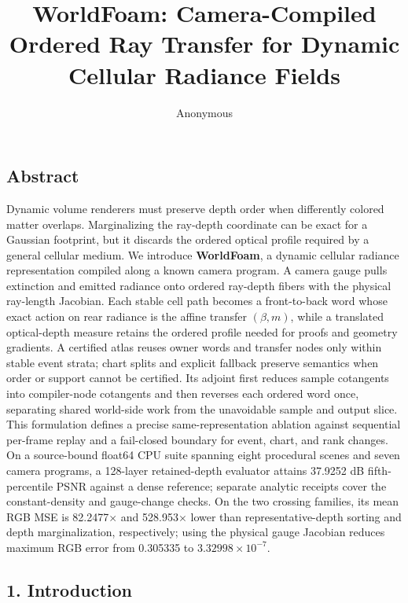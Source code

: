 \documentclass[
]{article}
\title{WorldFoam: Camera-Compiled Ordered Ray Transfer for Dynamic
Cellular Radiance Fields}
\author{Anonymous}
\date{}
\begin{document}
\maketitle

\subsection{Abstract}\label{abstract}

Dynamic volume renderers must preserve depth order when differently
colored matter overlaps. Marginalizing the ray-depth coordinate can be
exact for a Gaussian footprint, but it discards the ordered optical
profile required by a general cellular medium. We introduce
\textbf{WorldFoam}, a dynamic cellular radiance representation compiled
along a known camera program. A camera gauge pulls extinction and
emitted radiance onto ordered ray-depth fibers with the physical
ray-length Jacobian. Each stable cell path becomes a front-to-back word
whose exact action on rear radiance is the affine transfer
\((\beta,m)\), while a translated optical-depth measure retains the
ordered profile needed for proofs and geometry gradients. A certified
atlas reuses owner words and transfer nodes only within stable event
strata; chart splits and explicit fallback preserve semantics when order
or support cannot be certified. Its adjoint first reduces sample
cotangents into compiler-node cotangents and then reverses each ordered
word once, separating shared world-side work from the unavoidable sample
and output slice. This formulation defines a precise same-representation
ablation against sequential per-frame replay and a fail-closed boundary
for event, chart, and rank changes. On a source-bound float64 CPU suite
spanning eight procedural scenes and seven camera programs, a 128-layer
retained-depth evaluator attains 37.9252 dB fifth-percentile PSNR
against a dense reference; separate analytic receipts cover the
constant-density and gauge-change checks. On the two crossing families,
its mean RGB MSE is 82.2477\(\times\) and 528.953\(\times\) lower than
representative-depth sorting and depth marginalization, respectively;
using the physical gauge Jacobian reduces maximum RGB error from
0.305335 to \(3.32998\times10^{-7}\).

\subsection{1. Introduction}\label{introduction}
\end{document}
